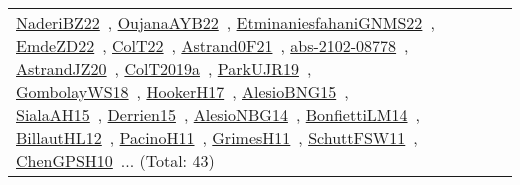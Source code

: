 {\begin{longtable}{lp{3cm}>{\raggedright\arraybackslash}p{6cm}>{\raggedright\arraybackslash}p{6cm}>{\raggedright\arraybackslash}p{8cm}}
\href{../works/NaderiBZ22.pdf}{NaderiBZ22}~\cite{NaderiBZ22}, \href{../works/OujanaAYB22.pdf}{OujanaAYB22}~\cite{OujanaAYB22}, \href{../works/EtminaniesfahaniGNMS22.pdf}{EtminaniesfahaniGNMS22}~\cite{EtminaniesfahaniGNMS22}, \href{../works/EmdeZD22.pdf}{EmdeZD22}~\cite{EmdeZD22}, \href{../works/ColT22.pdf}{ColT22}~\cite{ColT22}, \href{../works/Astrand0F21.pdf}{Astrand0F21}~\cite{Astrand0F21}, \href{../works/abs-2102-08778.pdf}{abs-2102-08778}~\cite{abs-2102-08778}, \href{../works/AstrandJZ20.pdf}{AstrandJZ20}~\cite{AstrandJZ20}, \href{../works/ColT2019a.pdf}{ColT2019a}~\cite{ColT2019a}, \href{../works/ParkUJR19.pdf}{ParkUJR19}~\cite{ParkUJR19}, \href{../works/GombolayWS18.pdf}{GombolayWS18}~\cite{GombolayWS18}, \href{../works/HookerH17.pdf}{HookerH17}~\cite{HookerH17}, \href{../works/AlesioBNG15.pdf}{AlesioBNG15}~\cite{AlesioBNG15}, \href{../works/SialaAH15.pdf}{SialaAH15}~\cite{SialaAH15}, \href{../works/Derrien15.pdf}{Derrien15}~\cite{Derrien15}, \href{../works/AlesioNBG14.pdf}{AlesioNBG14}~\cite{AlesioNBG14}, \href{../works/BonfiettiLM14.pdf}{BonfiettiLM14}~\cite{BonfiettiLM14}, \href{../works/BillautHL12.pdf}{BillautHL12}~\cite{BillautHL12}, \href{../works/PacinoH11.pdf}{PacinoH11}~\cite{PacinoH11}, \href{../works/GrimesH11.pdf}{GrimesH11}~\cite{GrimesH11}, \href{../works/SchuttFSW11.pdf}{SchuttFSW11}~\cite{SchuttFSW11}, \href{../works/ChenGPSH10.pdf}{ChenGPSH10}~\cite{ChenGPSH10}... (Total: 43)\\

\end{longtable}}
